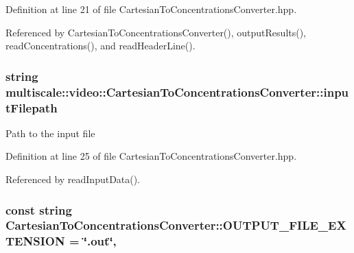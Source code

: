 Definition at line 21 of file Cartesian\-To\-Concentrations\-Converter.\-hpp.



Referenced by Cartesian\-To\-Concentrations\-Converter(), output\-Results(), read\-Concentrations(), and read\-Header\-Line().

\hypertarget{classmultiscale_1_1video_1_1CartesianToConcentrationsConverter_affebbc7e1c67692bd529f19fc0451e58}{
\subsubsection[{input\-Filepath}]{\setlength{\rightskip}{0pt plus 5cm}string multiscale\-::video\-::\-Cartesian\-To\-Concentrations\-Converter\-::input\-Filepath\hspace{0.3cm}{\ttfamily [private]}}}\label{classmultiscale_1_1video_1_1CartesianToConcentrationsConverter_affebbc7e1c67692bd529f19fc0451e58}
Path to the input file 

Definition at line 25 of file Cartesian\-To\-Concentrations\-Converter.\-hpp.



Referenced by read\-Input\-Data().

\hypertarget{classmultiscale_1_1video_1_1CartesianToConcentrationsConverter_ad412cf727ae7465d900365888fd19c4d}{
\subsubsection[{O\-U\-T\-P\-U\-T\-\_\-\-F\-I\-L\-E\-\_\-\-E\-X\-T\-E\-N\-S\-I\-O\-N}]{\setlength{\rightskip}{0pt plus 5cm}const string Cartesian\-To\-Concentrations\-Converter\-::\-O\-U\-T\-P\-U\-T\-\_\-\-F\-I\-L\-E\-\_\-\-E\-X\-T\-E\-N\-S\-I\-O\-N = \char`\"{}.out\char`\"{}\hspace{0.3cm}{\ttfamily [static]}, {\ttfamily [private]}}}\label{classmultiscale_1_1video_1_1CartesianToConcentrationsConverter_ad412cf727ae7465d900365888fd19c4d}


